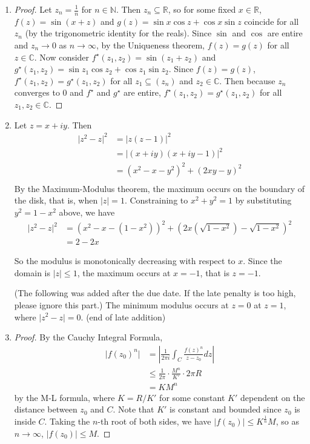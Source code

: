 \documentclass[11pt, letterpaper]{article}
\begin{document}
\begin{enumerate}
  \item \begin{proof}
    Let $z_n = \frac{1}{n}$ for $n \in \mathbb N$. Then $z_n \subseteq \mathbb R$, so for some fixed $x \in \mathbb R$,
    $f(z) = \sin(x + z)$ and  $g(z) = \sin x \cos z + \cos x \sin z$ coincide for all $z_n$ (by the trigonometric identity for the reals). Since $\sin$ and $\cos$ are entire and $z_n \to 0$ as $n \to \infty$, by the Uniqueness theorem, $f(z) = g(z)$ for all $z \in \mathbb C$. Now consider $f^\star(z_1, z_2) = \sin(z_1 + z_2)$ and $g^\star(z_1, z_2) = \sin z_1 \cos z_2 + \cos z_1 \sin z_2$. Since $f(z) = g(z)$, $f^\star(z_1, z_2) = g^\star(z_1, z_2)$ for all $z_1 \subseteq (z_n)$ and $z_2 \in \mathbb C$. Then because $z_n$ converges to 0 and $f^\star$ and $g^\star$ are entire, $f^\star(z_1, z_2) = g^\star(z_1, z_2)$ for all $z_1, z_2 \in \mathbb C$.
  \end{proof}

  \item Let $z = x + iy$. Then
  \begin{align*}
    \vert z^2 - z \vert^2
    &= \vert z(z - 1) \vert^2 \\
    &= \vert (x + iy)(x + iy - 1) \vert^2 \\
    &= (x^2 - x - y^2)^2 + (2xy - y)^2 \\
  \end{align*}
  By the Maximum-Modulus theorem, the maximum occurs on the boundary of the disk, that is, when $\vert z \vert = 1$. Constraining to $x^2 + y^2 = 1$ by substituting $y^2 = 1 - x^2$ above, we have
  \begin{align*}
    \vert z^2 - z \vert^2 &= (x^2 - x - (1 - x^2))^2 + (2x(\sqrt{1 - x^2}) - \sqrt{1 - x^2})^2 \\
    &= 2 - 2x
  \end{align*}

  So the modulus is monotonically decreasing with respect to $x$. Since the domain is $\vert z \vert \leq 1$, the maximum occurs at $x = -1$, that is $z = -1$.

  (The following was added after the due date. If the late penalty is too high, please ignore this part.)
  The minimum modulus occurs at $z = 0$ at $z = 1$, where $\vert z^2 - z \vert = 0$.
  (end of late addition)

  \item \begin{proof}
    By the Cauchy Integral Formula, \begin{align*}
      \vert f(z_0)^n \vert 
      &= \left\vert \frac{1}{2\pi i} \int_C \frac{f(z)^n}{z - z_0} dz \right\vert \\
      &\leq \frac{1}{2\pi} \cdot \frac {M^n}{K'} \cdot 2 \pi R \\
      &= KM^n
    \end{align*}
    by the M-L formula, where $K = R/K'$ for some constant $K'$ dependent on the distance between $z_0$ and $C$. Note that $K'$ is constant and bounded since $z_0$ is inside $C$. Taking the $n$-th root of both sides, we have $\vert f(z_0) \vert \leq K^{\frac{1}{n}} M$, so as $n \to \infty$, $\vert f(z_0) \vert \leq M$.
  \end{proof}
\end{enumerate}
\end{document}
